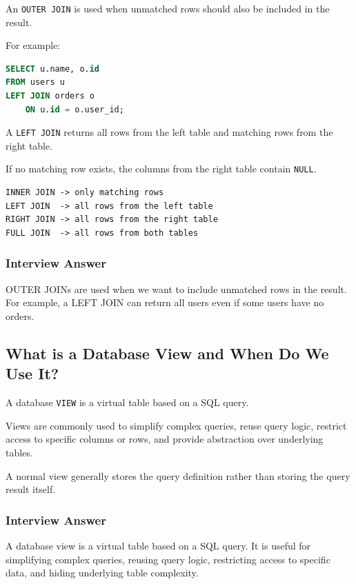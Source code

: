 \documentclass[12pt,a4paper]{article}
\begin{document}
An \texttt{OUTER JOIN} is used when unmatched rows should also be included
in the result.

For example:

\begin{lstlisting}[language=SQL]
SELECT u.name, o.id
FROM users u
LEFT JOIN orders o
    ON u.id = o.user_id;
\end{lstlisting}

A \texttt{LEFT JOIN} returns all rows from the left table and matching rows
from the right table.

If no matching row exists, the columns from the right table contain
\texttt{NULL}.

\begin{verbatim}
INNER JOIN -> only matching rows
LEFT JOIN  -> all rows from the left table
RIGHT JOIN -> all rows from the right table
FULL JOIN  -> all rows from both tables
\end{verbatim}

\subsubsection*{Interview Answer}

OUTER JOINs are used when we want to include unmatched rows in the result.
For example, a LEFT JOIN can return all users even if some users have no
orders.

\subsection{What is a Database View and When Do We Use It?}

A database \texttt{VIEW} is a virtual table based on a SQL query.

Views are commonly used to simplify complex queries, reuse query logic,
restrict access to specific columns or rows, and provide abstraction over
underlying tables.

A normal view generally stores the query definition rather than storing the
query result itself.

\subsubsection*{Interview Answer}

A database view is a virtual table based on a SQL query. It is useful for
simplifying complex queries, reusing query logic, restricting access to
specific data, and hiding underlying table complexity.
\end{document}
